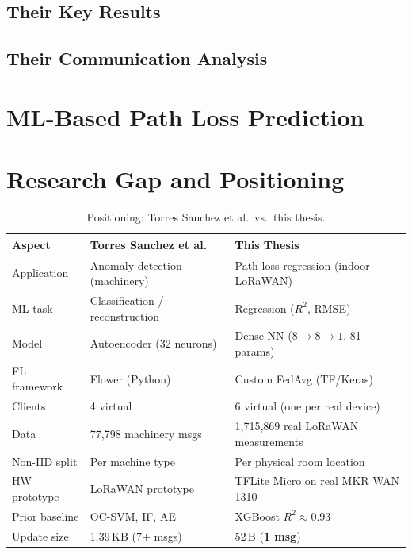 \documentclass[12pt, a4paper, twoside, openright]{report}
\begin{document}
\subsection{Their Key Results}

\subsection{Their Communication Analysis}

\section{ML-Based Path Loss Prediction}
\label{sec:ml-pathloss-related}

\section{Research Gap and Positioning}
\label{sec:research-gap}

\begin{table}[H]
  \centering
  \begin{tabular}{p{3.5cm} p{4cm} p{4cm}}
    \toprule
    \textbf{Aspect} & \textbf{Torres Sanchez et al.} & \textbf{This Thesis} \\
    \midrule
    Application       & Anomaly detection (machinery) & Path loss regression (indoor LoRaWAN) \\[3pt]
    ML task           & Classification / reconstruction & Regression ($R^2$, RMSE) \\[3pt]
    Model             & Autoencoder (32 neurons) & Dense NN ($8\to8\to1$, 81 params) \\[3pt]
    FL framework      & Flower (Python) & Custom FedAvg (TF/Keras) \\[3pt]
    Clients           & 4 virtual & 6 virtual (one per real device) \\[3pt]
    Data              & 77,798 machinery msgs & 1,715,869 real LoRaWAN measurements \\[3pt]
    Non-IID split     & Per machine type & Per physical room location \\[3pt]
    HW prototype      & LoRaWAN prototype & TFLite Micro on real MKR WAN 1310 \\[3pt]
    Prior baseline    & OC-SVM, IF, AE & XGBoost $R^2 \approx 0.93$ \\[3pt]
    Update size       & 1.39\,KB (7+ msgs) & 52\,B (\textbf{1 msg}) \\
    \bottomrule
  \end{tabular}
  \caption{Positioning: Torres Sanchez et al.\ vs.\ this thesis.}
  \label{tab:positioning}
\end{table}
\end{document}
